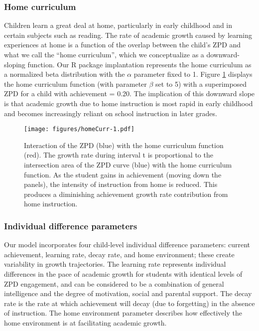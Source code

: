 \documentclass[english,floatsintext,jou]{apa6}
\theoremstyle{definition}
\theoremstyle{definition}
\theoremstyle{definition}
\theoremstyle{remark}
\begin{document}
\subsubsection{Home curriculum}\label{home-curriculum}

Children learn a great deal at home, particularly in early childhood and
in certain subjects such as reading. The rate of academic growth caused
by learning experiences at home is a function of the overlap between the
child's ZPD and what we call the \enquote{home curriculum}, which we
conceptualize as a downward-sloping function. Our R package implantation
represents the home curriculum as a normalized beta distribution with
the \(\alpha\) parameter fixed to 1. Figure \ref{fig:homeCurr} displays
the home curriculum function (with parameter \(\beta\) set to 5) with a
superimposed ZPD for a child with achievement = 0.20. The implication of
this downward slope is that academic growth due to home instruction is
most rapid in early childhood and becomes increasingly reliant on school
instruction in later grades.

\begin{figure}[htbp]
\centering
\texttt{[image: figures/homeCurr-1.pdf]}
\caption{\label{fig:homeCurr}Interaction of the ZPD (blue) with the home
curriculum function (red). The growth rate during interval t is
proportional to the intersection area of the ZPD curve (blue) with the
home curriculum function. As the student gains in achievement (moving
down the panels), the intensity of instruction from home is reduced.
This produces a diminishing achievement growth rate contribution from
home instruction.}
\end{figure}

\subsubsection{Individual difference
parameters}\label{individual-difference-parameters}

Our model incorporates four child-level individual difference
parameters: current achievement, learning rate, decay rate, and home
environment; these create variability in growth trajectories. The
learning rate represents individual differences in the pace of academic
growth for students with identical levels of ZPD engagement, and can be
considered to be a combination of general intelligence and the degree of
motivation, social and parental support. The decay rate is the rate at
which achievement will decay (due to forgetting) in the absence of
instruction. The home environment parameter describes how effectively
the home environment is at facilitating academic growth.
\end{document}
